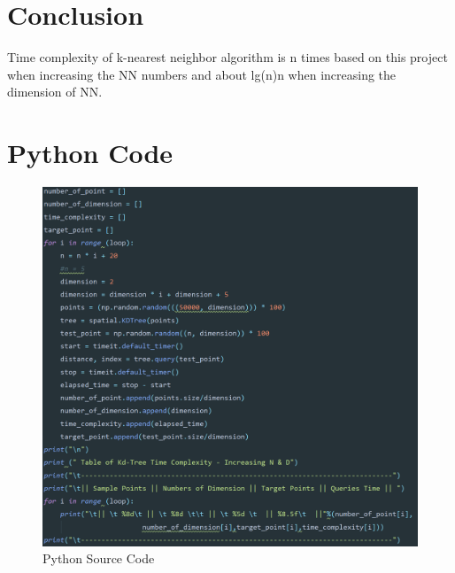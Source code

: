 \documentclass[12pt]{article}
\newcommand\tab[1][0.6cm]{\hspace*{#1}}
\begin{document}
	\section{\large Conclusion}
	\tab Time complexity of k-nearest neighbor algorithm is n times based on this project when increasing the NN numbers and about lg(n)n when increasing the dimension of NN. 
	\section{\large Python Code}
	\begin{figure}[H]
    	\centering
    	\includegraphics[width=14cm]{PythonCode.PNG}
    	\caption{Python Source Code} 
    	\label{fig:5}
    \end{figure}
    
\end{document}
